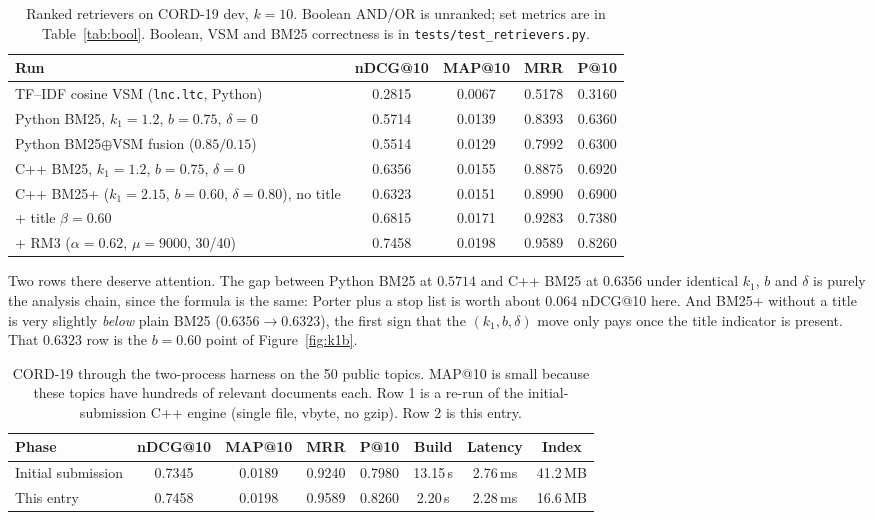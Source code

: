 \documentclass[10pt,a4paper]{article}
\begin{document}
\begin{table}[ht]\centering\footnotesize
\renewcommand{\arraystretch}{1.0}
\caption{Ranked retrievers on CORD-19 dev, $k{=}10$. Boolean AND/OR is unranked;
set metrics are in Table~\ref{tab:bool}. Boolean, VSM and BM25 correctness is in
\texttt{tests/test\_retrievers.py}.}
\label{tab:req}
\begin{tabular}{lcccc}
\toprule
Run & nDCG@10 & MAP@10 & MRR & P@10\\
\midrule
TF--IDF cosine VSM (\texttt{lnc.ltc}, Python) & 0.2815 & 0.0067 & 0.5178 & 0.3160\\
Python BM25, $k_1{=}1.2$, $b{=}0.75$, $\delta{=}0$ & 0.5714 & 0.0139 & 0.8393 & 0.6360\\
Python BM25$\oplus$VSM fusion ($0.85/0.15$) & 0.5514 & 0.0129 & 0.7992 & 0.6300\\
C++ BM25, $k_1{=}1.2$, $b{=}0.75$, $\delta{=}0$ & 0.6356 & 0.0155 & 0.8875 & 0.6920\\
C++ BM25+ ($k_1{=}2.15$, $b{=}0.60$, $\delta{=}0.80$), no title & 0.6323 & 0.0151 & 0.8990 & 0.6900\\
\quad + title $\beta{=}0.60$ & 0.6815 & 0.0171 & 0.9283 & 0.7380\\
\quad + RM3 ($\alpha{=}0.62$, $\mu{=}9000$, 30/40) & 0.7458 & 0.0198 & 0.9589 & 0.8260\\
\bottomrule
\end{tabular}
\end{table}

Two rows there deserve attention. The gap between Python BM25 at $0.5714$ and C++
BM25 at $0.6356$ under identical $k_1$, $b$ and $\delta$ is purely the analysis chain,
since the formula is the same: Porter plus a stop list is worth about $0.064$ nDCG@10
here. And BM25+ without a title is very slightly \emph{below} plain BM25
($0.6356\to 0.6323$), the first sign that the $(k_1,b,\delta)$ move only pays once
the title indicator is present. That $0.6323$ row is the $b{=}0.60$ point of
Figure~\ref{fig:k1b}.

\begin{table}[ht]\centering\footnotesize
\renewcommand{\arraystretch}{1.0}
\caption{CORD-19 through the two-process harness on the 50 public topics.
MAP@10 is small because these topics have hundreds of relevant documents each.
Row 1 is a re-run of the initial-submission C++ engine (single file, vbyte, no gzip).
Row 2 is this entry.}
\label{tab:eff}
\begin{tabular}{lccccccc}
\toprule
Phase & nDCG@10 & MAP@10 & MRR & P@10 & Build & Latency & Index\\
\midrule
Initial submission & 0.7345 & 0.0189 & 0.9240 & 0.7980 & 13.15\,s & 2.76\,ms & 41.2\,MB\\
This entry & 0.7458 & 0.0198 & 0.9589 & 0.8260 & 2.20\,s & 2.28\,ms & 16.6\,MB\\
\bottomrule
\end{tabular}
\end{table}
\end{document}
